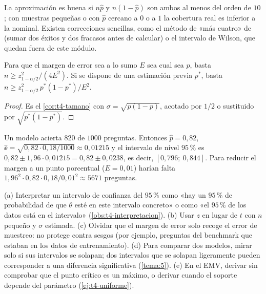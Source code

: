 La aproximación es buena si $n\widehat p$ y $n(1-\widehat p)$ son ambos al menos del orden de $10$; con muestras pequeñas o con $\widehat p$ cercano a $0$ o a $1$ la cobertura real es inferior a la nominal. Existen correcciones sencillas, como el método de «más cuatro» de~\cite[§8.3]{openstax} (sumar dos éxitos y dos fracasos antes de calcular) o el intervalo de Wilson, que quedan fuera de este módulo.

\begin{corolario}\label{cor:t4-tamano-p}
Para que el margen de error sea a lo sumo $E$ sea cual sea $p$, basta $n\ge z_{1-\alpha/2}^{2}/(4E^{2})$. Si se dispone de una estimación previa $p^{*}$, basta $n\ge z_{1-\alpha/2}^{2}\,p^{*}(1-p^{*})/E^{2}$.
\end{corolario}

\begin{proof}
Es el \cref{cor:t4-tamano} con $\sigma=\sqrt{p(1-p)}$, acotado por $1/2$ o sustituido por $\sqrt{p^{*}(1-p^{*})}$.
\end{proof}

\begin{ejemplo}\label{ej:t4-benchmark}
Un modelo acierta $820$ de $1000$ preguntas. Entonces $\widehat p=0{,}82$, $\widehat{\ee}=\sqrt{0{,}82\cdot0{,}18/1000}\approx0{,}01215$ y el intervalo de nivel $95\,\%$ es $0{,}82\pm1{,}96\cdot0{,}01215=0{,}82\pm0{,}0238$, es decir, $[0{,}796;\allowbreak\ 0{,}844]$. Para reducir el margen a un punto porcentual ($E=0{,}01$) harían falta $1{,}96^{2}\cdot0{,}82\cdot0{,}18/0{,}01^{2}\approx5671$ preguntas.
\end{ejemplo}

\begin{observacion}\label{obs:t4-errores}
(a) Interpretar un intervalo de confianza del $95\,\%$ como «hay un $95\,\%$ de probabilidad de que $\theta$ esté en este intervalo concreto» o como «el $95\,\%$ de los datos está en el intervalo» (\cref{obs:t4-interpretacion}).
(b) Usar $z$ en lugar de $t$ con $n$ pequeño y $\sigma$ estimada.
(c) Olvidar que el margen de error solo recoge el error de muestreo: no protege contra sesgos (por ejemplo, preguntas del benchmark que estaban en los datos de entrenamiento).
(d) Para comparar dos modelos, mirar solo si sus intervalos se solapan; dos intervalos que se solapan ligeramente pueden corresponder a una diferencia significativa (\cref{tema:5}).
(e) En el EMV, derivar sin comprobar que el punto crítico es un máximo, o derivar cuando el soporte depende del parámetro (\cref{ej:t4-uniforme}).
\end{observacion}

